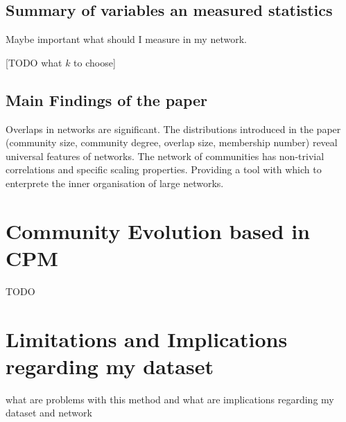 \documentclass[runningheads,a4paper]{llncs}
\begin{document}
\subsection{Summary of variables an measured statistics}
Maybe important what should I measure in my network.

[TODO what $k$ to choose]

\subsection{Main Findings of the paper}
Overlaps in networks are significant. The distributions introduced in the paper (community size, community degree, overlap size, membership number) reveal universal features of networks. The network of communities has non-trivial correlations and specific scaling properties. Providing a tool with which to enterprete the inner organisation of large networks.

\section{Community Evolution based in CPM}
TODO

\section{Limitations and Implications regarding my dataset}
what are problems with this method and what are implications regarding my dataset and network

{
	
	
}
\end{document}
